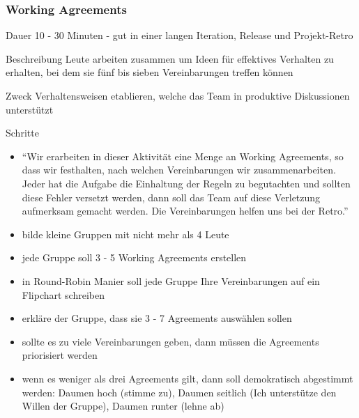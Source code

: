 \subsubsection{Working Agreements}
\begin{Beschreibungfett}[Beschreibung]
  \item [Dauer] 10 - 30 Minuten - gut in einer langen Iteration, Release und
    Projekt-Retro
  \item [Beschreibung] Leute arbeiten zusammen um Ideen für effektives Verhalten zu
    erhalten, bei dem sie fünf bis sieben Vereinbarungen treffen können
  \item [Zweck] Verhaltensweisen etablieren, welche das Team in produktive Diskussionen unterstützt
  \item [Schritte]
    \begin{itemize}
      \item \enquote{Wir erarbeiten in dieser Aktivität eine Menge an Working Agreements, so dass wir
        festhalten, nach welchen Vereinbarungen wir zusammenarbeiten. Jeder hat die Aufgabe die
        Einhaltung der Regeln zu begutachten und sollten diese Fehler versetzt werden, dann
        soll das Team auf diese Verletzung aufmerksam gemacht werden. Die Vereinbarungen helfen uns
        bei der Retro.}
      \item bilde kleine Gruppen mit nicht mehr als 4 Leute
      \item jede Gruppe soll 3 - 5 Working Agreements erstellen
      \item in Round-Robin Manier soll jede Gruppe Ihre Vereinbarungen auf ein Flipchart
        schreiben
      \item erkläre der Gruppe, dass sie 3 - 7 Agreements auswählen sollen
      \item sollte es zu viele Vereinbarungen geben, dann müssen die Agreements priorisiert
        werden
      \item wenn es weniger als drei Agreements gilt, dann soll demokratisch abgestimmt werden:
        Daumen hoch (stimme zu), Daumen seitlich (Ich unterstütze den Willen der Gruppe),
        Daumen runter (lehne ab)
    \end{itemize}
\end{Beschreibungfett}


